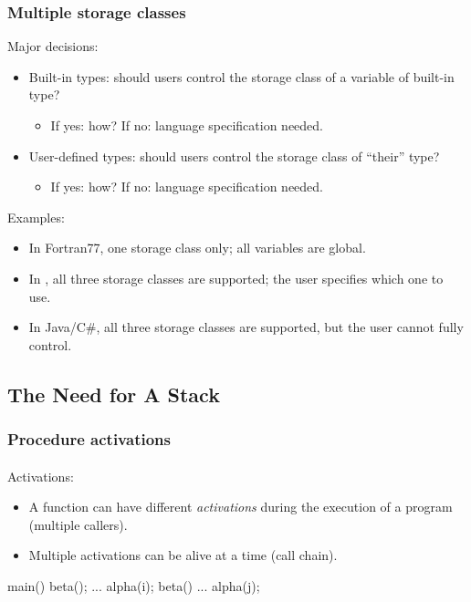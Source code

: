 \documentclass{beamer}
\begin{document}
\begin{frame}
\frametitle{Multiple storage classes} 
Major decisions:
\begin{itemize}

\item Built-in types: should users control the storage class of a
variable of built-in type?
\begin{itemize}
\item If yes: how? If no: language specification needed.
\end{itemize}

\item User-defined types: should users control the storage class of 
``their'' type?
\begin{itemize}
\item If yes: how? If no: language specification needed.
\end{itemize}

\end{itemize}

Examples:
\begin{itemize}
\item In Fortran77, one storage class only; all variables are global.
\item 
In \Cpp, all three storage classes are supported; the user
specifies which one to use. 
\item In Java/C\#, all three storage classes are supported, but the
user cannot fully control. 
\end{itemize}
\end{frame}


\subsection{The Need for A Stack}
\begin{frame}[fragile]
\frametitle{Procedure activations}
\framesubtitle{}
Activations:
\begin{itemize}
\item A function can have different \textit{activations} during the
execution of a program (multiple callers).
\item Multiple activations
can be alive at a time (call chain).
\end{itemize}

\begin{cplus3}
    main()  {
         beta();
         ...
         alpha(i);
    }
    beta(){
         ... 
         alpha(j);
    }
\end{cplus3}

\end{frame}
\end{document}
